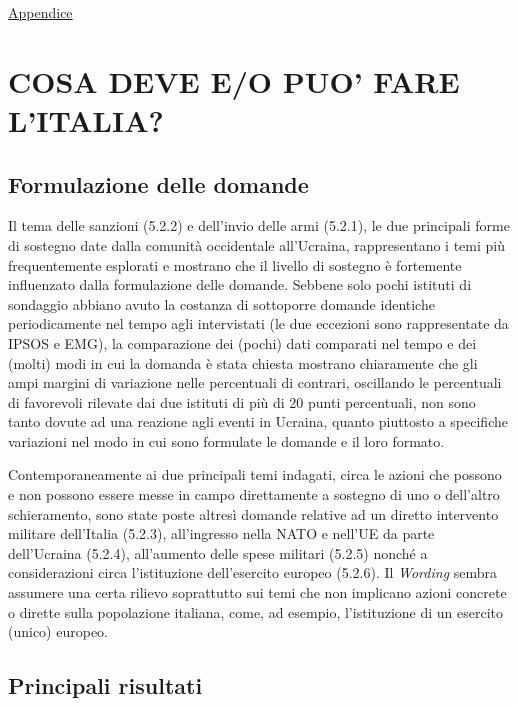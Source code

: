 \documentclass[
]{book}
\begin{document}
\href{https://github.com/LucianaFazio/Ucrania/blob/main/PDF_Appendice/IV.\%20La\%20guerra\%20e\%20il\%20suo\%20andamento\%20v.4.pdf}{Appendice}

\hypertarget{cosa-deve-eo-puo-fare-litalia}{%
\chapter{COSA DEVE E/O PUO' FARE L'ITALIA?}\label{cosa-deve-eo-puo-fare-litalia}}

\hypertarget{formulazione-delle-domande-3}{%
\section{Formulazione delle domande}\label{formulazione-delle-domande-3}}

Il tema delle sanzioni (5.2.2) e dell'invio delle armi (5.2.1), le due principali forme di sostegno date dalla comunità occidentale all'Ucraina, rappresentano i temi più frequentemente esplorati e mostrano che il livello di sostegno è fortemente influenzato dalla formulazione delle domande. Sebbene solo pochi istituti di sondaggio abbiano avuto la costanza di sottoporre domande identiche periodicamente nel tempo agli intervistati (le due eccezioni sono rappresentate da IPSOS e EMG), la comparazione dei (pochi) dati comparati nel tempo e dei (molti) modi in cui la domanda è stata chiesta mostrano chiaramente che gli ampi margini di variazione nelle percentuali di contrari, oscillando le percentuali di favorevoli rilevate dai due istituti di più di 20 punti percentuali, non sono tanto dovute ad una reazione agli eventi in Ucraina, quanto piuttosto a specifiche variazioni nel modo in cui sono formulate le domande e il loro formato.

Contemporaneamente ai due principali temi indagati, circa le azioni che possono e non possono essere messe in campo direttamente a sostegno di uno o dell'altro schieramento, sono state poste altresì domande relative ad un diretto intervento militare dell'Italia (5.2.3), all'ingresso nella NATO e nell'UE da parte dell'Ucraina (5.2.4), all'aumento delle spese militari (5.2.5) nonché a considerazioni circa l'istituzione dell'esercito europeo (5.2.6). Il \emph{Wording} sembra assumere una certa rilievo soprattutto sui temi che non implicano azioni concrete o dirette sulla popolazione italiana, come, ad esempio, l'istituzione di un esercito (unico) europeo.

\hypertarget{principali-risultati-3}{%
\section{Principali risultati}\label{principali-risultati-3}}
\end{document}
